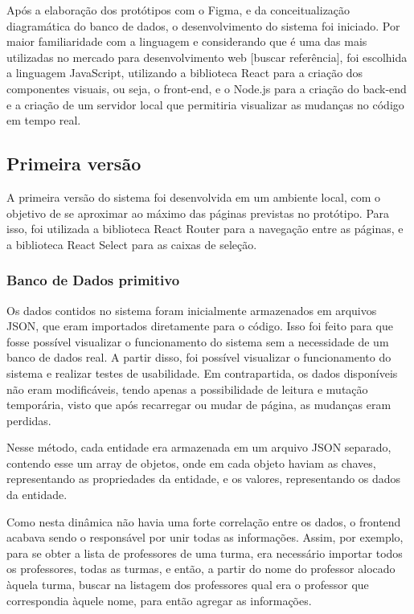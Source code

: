 
Após a elaboração dos protótipos com o Figma, e da conceitualização diagramática do banco de dados, o desenvolvimento do sistema foi iniciado. Por maior familiaridade com a linguagem e considerando que é uma das mais utilizadas no mercado para desenvolvimento web [buscar referência], foi escolhida a linguagem JavaScript, utilizando a biblioteca React para a criação dos componentes visuais, ou seja, o front-end, e o Node.js para a criação do back-end e a criação de um servidor local que permitiria visualizar as mudanças no código em tempo real.


\subsection{Primeira versão} %

A primeira versão do sistema foi desenvolvida em um ambiente local, com o objetivo de se aproximar ao máximo das páginas previstas no protótipo. Para isso, foi utilizada a biblioteca React Router para a navegação entre as páginas, e a biblioteca React Select para as caixas de seleção.

\subsubsection{Banco de Dados primitivo}

Os dados contidos no sistema foram inicialmente armazenados em arquivos JSON, que eram importados diretamente para o código. Isso foi feito para que fosse possível visualizar o funcionamento do sistema sem a necessidade de um banco de dados real. A partir disso, foi possível visualizar o funcionamento do sistema e realizar testes de usabilidade. Em contrapartida, os dados disponíveis não eram modificáveis, tendo apenas a possibilidade de leitura e mutação temporária, visto que após recarregar ou mudar de página, as mudanças eram perdidas.

Nesse método, cada entidade era armazenada em um arquivo JSON separado, contendo esse um array de objetos, onde em cada objeto haviam as chaves, representando as propriedades da entidade, e os valores, representando os dados da entidade.

Como nesta dinâmica não havia uma forte correlação entre os dados, o frontend acabava sendo o responsável por unir todas as informações. Assim, por exemplo, para se obter a lista de professores de uma turma, era necessário importar todos os professores, todas as turmas, e então, a partir do nome do professor alocado àquela turma, buscar na listagem dos professores qual era o professor que correspondia àquele nome, para então agregar as informações.


